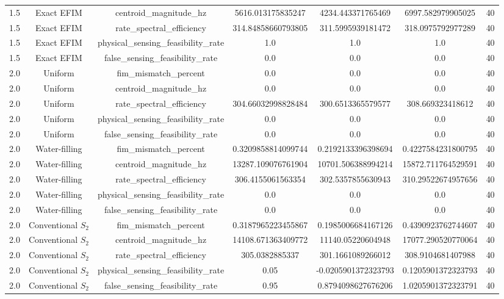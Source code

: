 \begin{table}[t]
\begin{tabular}{lcccccc}
1.5 & Exact EFIM & centroid_magnitude_hz & 5616.013175835247 & 4234.443371765469 & 6997.582979905025 & 40 \\
1.5 & Exact EFIM & rate_spectral_efficiency & 314.84858660793805 & 311.5995939181472 & 318.0975792977289 & 40 \\
1.5 & Exact EFIM & physical_sensing_feasibility_rate & 1.0 & 1.0 & 1.0 & 40 \\
1.5 & Exact EFIM & false_sensing_feasibility_rate & 0.0 & 0.0 & 0.0 & 40 \\
2.0 & Uniform & fim_mismatch_percent & 0.0 & 0.0 & 0.0 & 40 \\
2.0 & Uniform & centroid_magnitude_hz & 0.0 & 0.0 & 0.0 & 40 \\
2.0 & Uniform & rate_spectral_efficiency & 304.66032998828484 & 300.6513365579577 & 308.669323418612 & 40 \\
2.0 & Uniform & physical_sensing_feasibility_rate & 0.0 & 0.0 & 0.0 & 40 \\
2.0 & Uniform & false_sensing_feasibility_rate & 0.0 & 0.0 & 0.0 & 40 \\
2.0 & Water-filling & fim_mismatch_percent & 0.3209858814099744 & 0.2192133396398694 & 0.4227584231800795 & 40 \\
2.0 & Water-filling & centroid_magnitude_hz & 13287.109076761904 & 10701.506388994214 & 15872.711764529591 & 40 \\
2.0 & Water-filling & rate_spectral_efficiency & 306.4155061563354 & 302.5357855630943 & 310.29522674957656 & 40 \\
2.0 & Water-filling & physical_sensing_feasibility_rate & 0.0 & 0.0 & 0.0 & 40 \\
2.0 & Water-filling & false_sensing_feasibility_rate & 0.0 & 0.0 & 0.0 & 40 \\
2.0 & Conventional $S_2$ & fim_mismatch_percent & 0.3187965223455867 & 0.1985006684167126 & 0.4390923762744607 & 40 \\
2.0 & Conventional $S_2$ & centroid_magnitude_hz & 14108.671363409772 & 11140.05220604948 & 17077.290520770064 & 40 \\
2.0 & Conventional $S_2$ & rate_spectral_efficiency & 305.0382885337 & 301.1661089266012 & 308.9104681407988 & 40 \\
2.0 & Conventional $S_2$ & physical_sensing_feasibility_rate & 0.05 & -0.0205901372323793 & 0.1205901372323793 & 40 \\
2.0 & Conventional $S_2$ & false_sensing_feasibility_rate & 0.95 & 0.8794098627676206 & 1.0205901372323791 & 40 \\

\end{tabular}
\end{table}
